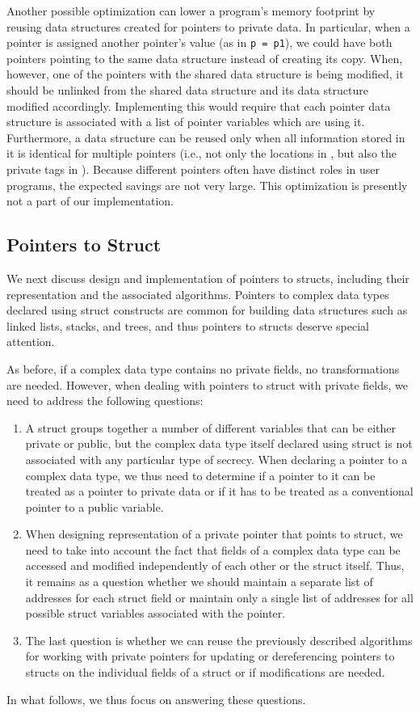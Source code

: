 \documentclass[11pt]{article}
\begin{document}
Another possible optimization can lower a program's memory footprint by
reusing data structures created for pointers to private data. In particular,
when a pointer is assigned another pointer's value (as in \texttt{p = p1}),
we could have both pointers pointing to the same data structure instead of
creating its copy. When, however, one of the pointers with the shared data
structure is being modified, it should be unlinked from the shared data
structure and its data structure modified accordingly. Implementing this
would require that each pointer data structure is associated with a list of
pointer variables which are using it. Furthermore, a data structure can be
reused only when all information stored in it is identical for multiple
pointers (i.e., not only the locations in , but also the private tags in
). Because different pointers often have distinct roles in user programs,
the expected savings are not very large. This optimization is presently not
a part of our implementation.

\subsection{Pointers to Struct}
\label{sec:struct}

We next discuss design and implementation of pointers to structs, including
their representation and the associated algorithms.  Pointers to complex
data types declared using struct constructs are common for building data
structures such as linked lists, stacks, and trees, and thus pointers to
structs deserve special attention. 

As before, if a complex data type contains no private fields, no
transformations are needed. However, when dealing with pointers to struct
with private fields, we need to address the following questions:
\begin{enumerate}
  \item A struct groups together a number of different variables that can be
    either private or public, but the complex data type itself declared
    using struct is not associated with any particular type of secrecy. When
    declaring a pointer to a complex data type, we thus need to
    determine if a pointer to it can be treated as a pointer to private
    data or if it has to be treated as a conventional pointer to a public
    variable.
  \item When designing representation of a private pointer that points to
    struct, we need to take into account the fact that fields of a complex
    data type can be accessed and modified independently of each other or
    the struct itself. Thus, it remains as a question whether we should
    maintain a separate list of addresses for each struct field or maintain
    only a single list of addresses for all possible struct variables
    associated with the pointer.
  \item The last question is whether we can reuse the previously described
    algorithms for working with private pointers for updating or
    dereferencing pointers to structs on the individual fields of a struct
    or if modifications are needed.
\end{enumerate}    
In what follows, we thus focus on answering these questions.
    
\end{document}
